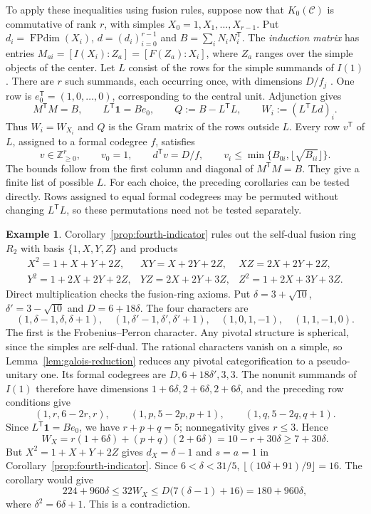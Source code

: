 \documentclass[11pt]{amsart}
\theoremstyle{definition}
\newtheorem{example}[theorem]{Example}
\DeclareMathOperator{\FPdim}{FPdim}
\newcommand{\Z}{\mathbb Z}
\numberwithin{equation}{section}
\begin{document}
To apply these inequalities using fusion rules, suppose now that
$K_0(\mathcal C)$ is commutative of rank $r$, with simples
$X_0=1,X_1,\ldots,X_{r-1}$. Put $d_i=\FPdim(X_i)$,
$d=(d_i)_{i=0}^{r-1}$ and $B=\sum_iN_iN_i^{\mathsf T}$.
The \emph{induction matrix} has entries
$M_{ai}=[I(X_i):Z_a]=[F(Z_a):X_i]$, where $Z_a$ ranges over the
simple objects of the center. Let $L$ consist of the rows for the
simple summands of $I(1)$. There are $r$ such summands, each occurring
once, with dimensions $D/f_j$ \cite[Theorem~2.13]{OstrikRank3}.
One row is $e_0^{\mathsf T}=(1,0,\ldots,0)$, corresponding to the
central unit. Adjunction gives
\[
 M^{\mathsf T}M=B,\qquad L^{\mathsf T}\mathbf1=Be_0,\qquad
 Q:=B-L^{\mathsf T}L,\qquad W_i:=(L^{\mathsf T}Ld)_i.
\]
Thus $W_i=W_{X_i}$ and $Q$ is the Gram matrix of the rows outside $L$.
Every row $v^{\mathsf T}$ of $L$, assigned to a formal codegree $f$, satisfies
\[
 v\in\Z_{\geq0}^r,\qquad v_0=1,\qquad d^{\mathsf T}v=D/f,
 \qquad v_i\leq\min\{B_{0i},\lfloor\sqrt{B_{ii}}\rfloor\}.
\]
The bounds follow from the first column and diagonal of
$M^{\mathsf T}M=B$. They give a finite list of possible $L$.
For each choice, the preceding corollaries can be tested directly.
Rows assigned to equal formal codegrees may be permuted without changing
$L^{\mathsf T}L$, so these permutations need not be tested separately.

\begin{example}\label{ex:R2}
Corollary~\ref{prop:fourth-indicator} rules out the self-dual fusion ring
$R_2$ with basis $\{1,X,Y,Z\}$ and products
\[
\begin{array}{lll}
 X^2=1+X+Y+2Z,&XY=X+2Y+2Z,&XZ=2X+2Y+2Z,\\
 Y^2=1+2X+2Y+2Z,&YZ=2X+2Y+3Z,&Z^2=1+2X+3Y+3Z.
\end{array}
\]
Direct multiplication checks the fusion-ring axioms. Put
$\delta=3+\sqrt{10}$, $\delta'=3-\sqrt{10}$ and $D=6+18\delta$.
The four characters are
\[
 (1,\delta-1,\delta,\delta+1),\quad
 (1,\delta'-1,\delta',\delta'+1),\quad
 (1,0,1,-1),\quad(1,1,-1,0).
\]
The first is the Frobenius--Perron character. Any pivotal structure is
spherical, since the simples are self-dual. The rational characters
vanish on a simple, so Lemma~\ref{lem:galois-reduction} reduces any
pivotal categorification to a pseudo-unitary one.
Its formal codegrees are $D,6+18\delta',3,3$.
The nonunit summands of $I(1)$ therefore have dimensions
$1+6\delta,2+6\delta,2+6\delta$, and the preceding row conditions give
\[
 (1,r,6-2r,r),\qquad (1,p,5-2p,p+1),\qquad (1,q,5-2q,q+1).
\]
Since $L^{\mathsf T}\mathbf1=Be_0$, we have $r+p+q=5$;
nonnegativity gives $r\leq3$. Hence
\[
 W_X=r(1+6\delta)+(p+q)(2+6\delta)
     =10-r+30\delta\geq7+30\delta.
\]
But $X^2=1+X+Y+2Z$ gives $d_X=\delta-1$ and $s=a=1$ in
Corollary~\ref{prop:fourth-indicator}. Since $6<\delta<31/5$,
$\lfloor(10\delta+91)/9\rfloor=16$. The corollary would give
\[
 224+960\delta\leq32W_X
 \leq D\bigl(7(\delta-1)+16\bigr)=180+960\delta,
\]
where $\delta^2=6\delta+1$. This is a contradiction.
\end{example}
\end{document}
